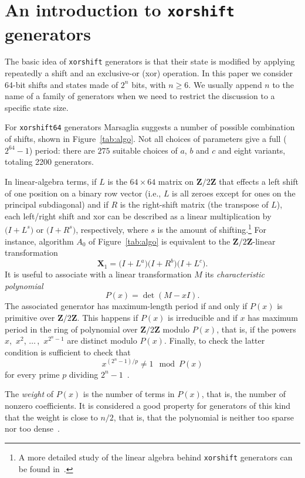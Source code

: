 \documentclass{acmsmalltr}
\newcommand{\Z}{\mathbf Z}
\newcommand{\xorshift}[1][]{\texttt{xorshift#1}\xspace}
\begin{document}
\section{An introduction to \xorshift generators}

The basic idea of \xorshift generators is that their state is modified by
applying repeatedly a shift and an exclusive-or (xor) operation. In this paper we consider
64-bit shifts and states made of $2^n$ bits, with $n\geq 6$. We usually append
$n$ to the name of a family of generators when we need to restrict the discussion 
to a specific state size.

For \xorshift[64] generators Marsaglia suggests a number of possible combination of shifts,
shown in Figure~\ref{tab:algo}. Not all choices of parameters give a full ($2^{64}-1$)
period: there are $275$ suitable choices of $a$, $b$ and $c$ and eight variants,
totaling 2200 generators.
 
In linear-algebra terms, if $L$ is the $64\times 64$ matrix on $\Z/2\Z$ that effects a left shift of
one position on a binary row vector (i.e., $L$ is all zeroes except for ones on
the principal subdiagonal) and if $R$ is the right-shift
matrix (the transpose of $L$), each left/right shift and xor can be described as
a linear multiplication by $\bigl(I+L^s\bigr)$ or $\bigl(I+R^s\bigr)$, respectively, where $s$ is the
amount of shifting.\footnote{A more detailed study of the linear algebra behind \xorshift generators can be found in~\cite{MarXR,PaLXRNG}.} For instance, algorithm $A_0$ of Figure~\ref{tab:algo} is equivalent to the
$\Z/2\Z$-linear transformation
\[
\mathbf{X}_1 = \bigl(I+L^a\bigr)\bigl(I+R^b\bigr)\bigl(I+L^c\bigr). 
\]
It is useful to associate with a linear transformation $M$ its \emph{characteristic polynomial}
\[
P(x)=\operatorname{det}(M-xI).
\]
The associated generator has maximum-length period if and only if $P(x)$ is primitive over $\Z/2\Z$. 
This happens if $P(x)$ is irreducible and if $x$ has
maximum period in the ring of polynomial over $\Z/2\Z$ modulo $P(x)$, that is, if
the powers $x$,~$x^2$, $\dots\,$,~$x^{2^n-1}$ are distinct modulo $P(x)$. Finally,
to check the latter condition is sufficient to check that
\[x^{(2^n-1)/p}\neq 1\mod P(x)\]
for every prime $p$ dividing $2^n-1$~\cite{LiNIFFA}. 

The \emph{weight} of $P(x)$ is the number
of terms in $P(x)$, that is, the number of nonzero coefficients. It is considered a good property for generators
of this kind that the weight is close to $n/2$, that is, that the polynomial
is neither too sparse nor too dense~\cite{ComHCRBS}.
\end{document}
